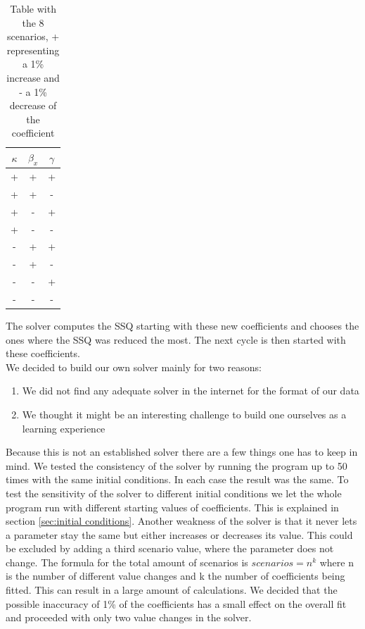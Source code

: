 \documentclass[11pt]{article}
\begin{document}
\begin{table}[htb]
\caption{Table with the 8 scenarios, + representing a 1\% increase and - a 1\% decrease of the coefficient }
\centering
\begin{tabular}{|c|c|c|}
\hline 
$\kappa$ & $\beta_{x}$ & $\gamma$ \\ 
\hline 
+ & + & + \\ 
\hline 
+ & + & - \\ 
\hline 
+ & - & + \\ 
\hline 
+ & - & - \\ 
\hline 
- & + & + \\ 
\hline 
- & + & - \\ 
\hline 
- & - & + \\ 
\hline 
- & - & - \\ 
\hline 
\end{tabular} 
\label{tab:solverbuild}
\end{table}




The solver computes the SSQ starting with these new coefficients and chooses the ones where the SSQ was reduced the most. The next cycle is then started with these coefficients.\\
We decided to build our own solver mainly for two reasons:

\begin{enumerate}
\item We did not find any adequate solver in the internet for the format of our data
\item We thought it might be an interesting challenge to build one ourselves as a learning experience
\end{enumerate}

Because this is not an established solver there are a few things one has to keep in mind. We tested the consistency of the solver by running the program up to 50 times with the same initial conditions. In each case the result was the same. To test the sensitivity of the solver to different initial conditions we let the whole program run with different starting values of coefficients. This is explained in section \ref{sec:initial conditions}. Another weakness of the solver is that it never lets a parameter stay the same but either increases or decreases its value. This could be excluded by adding a third scenario value, where the parameter does not change. The formula for the total amount of scenarios is $scenarios=n^{k}$ where n is the number of different value changes and k the number of coefficients being fitted. This can result in a large amount of calculations. We decided that the possible inaccuracy of 1\% of the coefficients has a small effect on the overall fit and proceeded with only two value changes in the solver.
\end{document}
